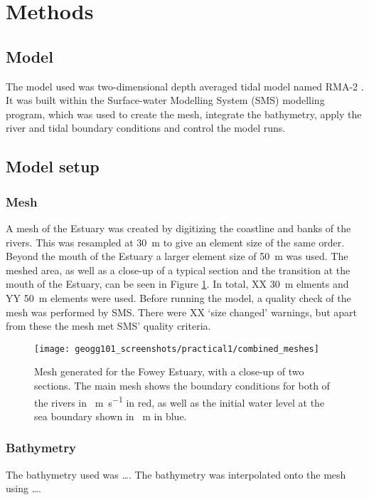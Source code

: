\documentclass{article}
\begin{document}
\section{Methods}

\subsection{Model}

The model used was two-dimensional depth averaged tidal model named RMA-2 \parencite{king1990program}. It was built within the Surface-water Modelling System (SMS) modelling program, which was used to create the mesh, integrate the bathymetry, apply the river and tidal boundary conditions and control the model runs.

\subsection{Model setup}

\subsubsection{Mesh}
A mesh of the Estuary was created by digitizing the coastline and banks of the rivers. This was resampled at \SI{30}{m} to give an element size of the same order. Beyond the mouth of the Estuary a larger element size of \SI{50}{m} was used. The meshed area, as well as a close-up of a typical section and the transition at the mouth of the Estuary, can be seen in Figure \ref{fig:combined_meshes}. In total, XX \SI{30}{m} elments and YY \SI{50}{m} elements were used. Before running the model, a quality check of the mesh was performed by SMS. There were XX `size changed' warnings, but apart from these the mesh met SMS' quality criteria.


\begin{figure}[hbp]
    \centering
    \texttt{[image: geogg101\_screenshots/practical1/combined\_meshes]}
    \caption{Mesh generated for the Fowey Estuary, with a close-up of two sections. The main mesh shows the boundary conditions for both of the rivers in \SI{}{m.s^{-1}} in red, as well as the initial water level at the sea boundary shown in \SI{}{m} in blue.}
    \label{fig:combined_meshes}
\end{figure}

\subsubsection{Bathymetry}
The bathymetry used was \ldots. The bathymetry was interpolated onto the mesh using \dots.
\end{document}
